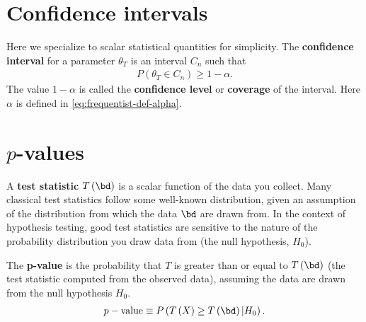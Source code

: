 \section{Confidence intervals}

Here we specialize to scalar statistical quantities for simplicity.
The \textbf{confidence interval} for a parameter $\theta_T$ is an interval $C_n$ such that
\begin{align}
    P\left(\theta_T\in C_n\right) \geq 1 - \alpha
    .
\end{align}
The value $1-\alpha$ is called the \textbf{confidence level} or \textbf{coverage} of the interval.
Here $\alpha$ is defined in \eqref{eq:frequentist-def-alpha}. 

\section{$p$-values}
A \textbf{test statistic} $T\left(\bd\right)$ is a scalar function of the data you collect.
Many classical test statistics follow some well-known distribution, given an assumption of the distribution from which the data $\bd$ are drawn from.
In the context of hypothesis testing, good test statistics are sensitive to the nature of the probability distribution you draw data from (the null hypothesis, $H_0$). 

The \textbf{p-value} is the probability that $T$ is greater than or equal to $T\left(\bd\right)$ (the test statistic computed from the observed data), assuming the data are drawn from the null hypothesis $H_0$.
\begin{align}
    \label{eq:p-value-definition}
    p-\mathrm{value}
    \equiv
    P\left(T\left(X\right)\geq T\left(\bd\right)|H_0\right)
    .
\end{align}

